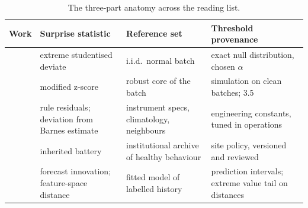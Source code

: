 \begin{table}[t]
  \centering
  \small
  \caption{The three-part anatomy across the reading list.}
  \label{tab:anatomy}
  \begin{tabular}{@{}p{2.9cm}p{3.4cm}p{3.6cm}p{4.4cm}@{}}
    \toprule
    Work & Surprise statistic & Reference set & Threshold provenance \\
    \midrule
    \citet{grubbs1969} & extreme studentised deviate
      & i.i.d.\ normal batch & exact null distribution, chosen $\alpha$ \\
    \citet{iglewicz1993} & modified z-score
      & robust core of the batch & simulation on clean batches; 3.5 \\
    \citet{shafer2000} & rule residuals; deviation from Barnes estimate
      & instrument specs, climatology, neighbours & engineering constants,
        tuned in operations \\
    \citet{campbell2013} & inherited battery
      & institutional archive of healthy behaviour & site policy, versioned
        and reviewed \\
    \citet{leigh2019} & forecast innovation; feature-space distance
      & fitted model of labelled history & prediction intervals; extreme
        value tail on distances \\
    \bottomrule
  \end{tabular}
\end{table}
